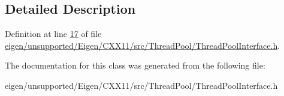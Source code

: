 \subsection{Detailed Description}


Definition at line \hyperlink{eigen_2unsupported_2_eigen_2_c_x_x11_2src_2_thread_pool_2_thread_pool_interface_8h_source_l00017}{17} of file \hyperlink{eigen_2unsupported_2_eigen_2_c_x_x11_2src_2_thread_pool_2_thread_pool_interface_8h_source}{eigen/unsupported/\+Eigen/\+C\+X\+X11/src/\+Thread\+Pool/\+Thread\+Pool\+Interface.\+h}.



The documentation for this class was generated from the following file\+:\begin{DoxyCompactItemize}
\item 
eigen/unsupported/\+Eigen/\+C\+X\+X11/src/\+Thread\+Pool/\+Thread\+Pool\+Interface.\+h\end{DoxyCompactItemize}
